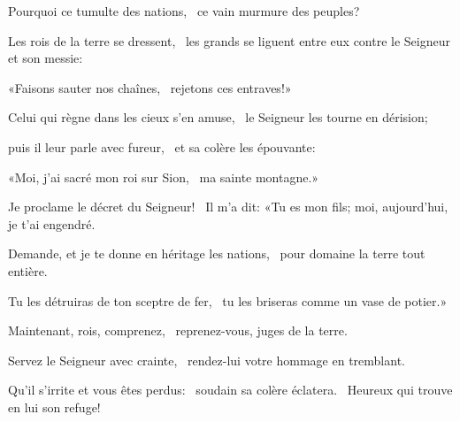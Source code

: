 \item Pourquoi ce tumulte des nations,~\psstar{} ce vain murmure des peuples?
\item Les rois de la terre se dressent,~\psstar{} les grands se liguent entre eux contre le Seigneur et son messie:
\item «Faisons sauter nos chaînes,~\psstar{} rejetons ces entraves!»
\item Celui qui règne dans les cieux s'en amuse,~\psstar{} le Seigneur les tourne en dérision;
\item puis il leur parle avec fureur,~\psstar{} et sa colère les épouvante:
\item «Moi, j'ai sacré mon roi sur Sion,~\psstar{} ma sainte montagne.»
\item Je proclame le décret du Seigneur!~\pscross{} Il m'a dit: «Tu es mon fils; moi, aujourd'hui, je t'ai engendré.
\item Demande, et je te donne en héritage les nations,~\psstar{} pour domaine la terre tout entière.
\item Tu les détruiras de ton sceptre de fer,~\psstar{} tu les briseras comme un vase de potier.»
\item Maintenant, rois, comprenez,~\psstar{} reprenez-vous, juges de la terre.
\item Servez le Seigneur avec crainte,~\psstar{} rendez-lui votre hommage en tremblant.
\item Qu'il s'irrite et vous êtes perdus:~\pscross{} soudain sa colère éclatera.~\psstar{} Heureux qui trouve en lui son refuge!